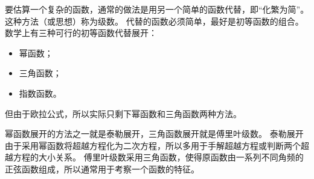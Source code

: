 要估算一个复杂的函数，通常的做法是用另一个简单的函数代替，即“化繁为简”。
这种方法（或思想）称为级数。
代替的函数必须简单，最好是初等函数的组合。
数学上有三种可行的初等函数代替展开：
\begin{itemize}
    \item 幂函数；
    \item 三角函数；
    \item 指数函数。
\end{itemize}
但由于欧拉公式，所以实际只剩下幂函数和三角函数两种方法。

幂函数展开的方法之一就是泰勒展开，三角函数展开就是傅里叶级数。
泰勒展开由于采用幂函数将超越方程化为二次方程，所以多用于手解超越方程或判断两个超越方程的大小关系。
傅里叶级数采用三角函数，使得原函数由一系列不同角频的正弦函数组成，所以通常用于考察一个函数的特征。




